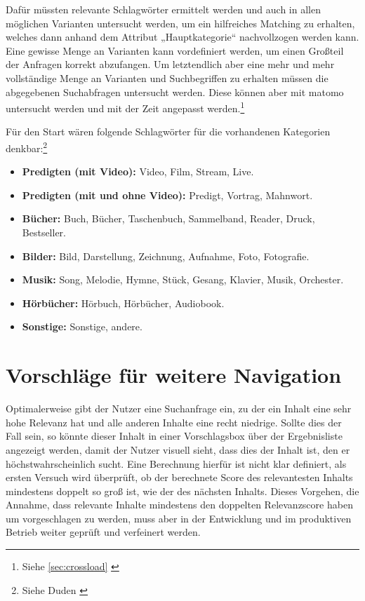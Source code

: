 Dafür müssten relevante Schlagwörter ermittelt werden und auch in allen möglichen Varianten untersucht werden, um ein hilfreiches Matching zu erhalten, welches dann anhand dem Attribut „Hauptkategorie“ nachvollzogen werden kann.
Eine gewisse Menge an Varianten kann vordefiniert werden, um einen Großteil der Anfragen korrekt abzufangen.
Um letztendlich aber eine mehr und mehr vollständige Menge an Varianten und Suchbegriffen zu erhalten müssen die abgegebenen Suchabfragen untersucht werden.
Diese können aber mit \gls{matomo} untersucht werden und mit der Zeit angepasst werden.\footnote{Siehe \ref{sec:crossload} \cite{matomo2022}}

Für den Start wären folgende Schlagwörter für die vorhandenen Kategorien denkbar:\footnote{Siehe Duden \cite{dudensynonyme2022}}
\begin{itemize}
  \item \textbf{Predigten (mit Video):} Video, Film, Stream, Live.
  \item \textbf{Predigten (mit und ohne Video):} Predigt, Vortrag, Mahnwort.
  \item \textbf{Bücher:} Buch, Bücher, Taschenbuch, Sammelband, Reader, Druck, Bestseller.
  \item \textbf{Bilder:} Bild, Darstellung, Zeichnung, Aufnahme, Foto, Fotografie.
  \item \textbf{Musik:} Song, Melodie, Hymne, Stück, Gesang, Klavier, Musik, Orchester.
  \item \textbf{Hörbücher:} Hörbuch, Hörbücher, Audiobook.
  \item \textbf{Sonstige:} Sonstige, andere.
\end{itemize}

\section{Vorschläge für weitere Navigation}
\label{sub:suggestion}
Optimalerweise gibt der Nutzer eine Suchanfrage ein, zu der ein Inhalt eine sehr hohe Relevanz hat und alle anderen Inhalte eine recht niedrige.
Sollte dies der Fall sein, so könnte dieser Inhalt in einer Vorschlagsbox über der Ergebnisliste angezeigt werden, damit der Nutzer visuell sieht, dass dies der Inhalt ist, den er höchstwahrscheinlich sucht.
Eine Berechnung hierfür ist nicht klar definiert, als ersten Versuch wird überprüft, ob der berechnete Score des relevantesten Inhalts mindestens doppelt so groß ist, wie der des nächsten Inhalts.
Dieses Vorgehen, die Annahme, dass relevante Inhalte mindestens den doppelten Relevanzscore haben um vorgeschlagen zu werden, muss aber in der Entwicklung und im produktiven Betrieb weiter geprüft und verfeinert werden.

